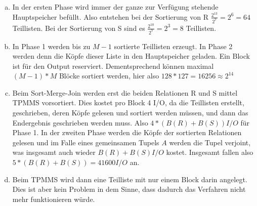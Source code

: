 \documentclass[12pt]{article}
\begin{document}
\begin{enumerate}[a)]
    \item In der ersten Phase wird immer der ganze zur Verfügung stehende
        Hauptspeicher befüllt. Also entstehen bei der Sortierung von R
        $\frac{2^{13}}{2^7} = 2^6 = 64$ Teillisten. Bei der Sortierung von S
        sind es $\frac{2^{10}}{2^7} = 2^3 = 8$ Teillisten.

    \item In Phase 1 werden bis zu $M - 1$ sortierte Teillisten erzeugt. In
        Phase 2 werden denn die Köpfe dieser Liste in den Hauptspeicher geladen.
        Ein Block ist für den Output reserviert. Dementsprechend können maximal
        $(M-1) * M$ Blöcke sortiert werden, hier also $128*127 = 16256 \approx
        2^{14}$

    \item Beim Sort-Merge-Join werden erst die beiden Relationen R und S mittel
        TPMMS vorsortiert. Dies kostet pro Block 4 I/O, da die Teillisten
        erstellt, geschrieben, deren Köpfe gelesen und sortiert werden müssen,
        und dann das Endergebnis geschrieben werden muss. Also $4*(B(R) + B(S))
        I/O$ für Phase 1. In der zweiten Phase werden die Köpfe der sortierten
        Relationen gelesen und im Falle eines gemeinsamen Tupels $A$ werden die
        Tupel verjoint, was insgesamt auch wieder $B(R)+B(S) I/O$ kostet.
        Insgesamt fallen also $5*(B(R)+B(S)) = 41600 I/O$ an.

    \item Beim TPMMS wird dann eine Teilliste mit nur einem Block darin angelegt.
        Dies ist aber kein Problem in dem Sinne, dass dadurch das Verfahren
        nicht mehr funktionieren würde.
\end{enumerate}
\end{document}
